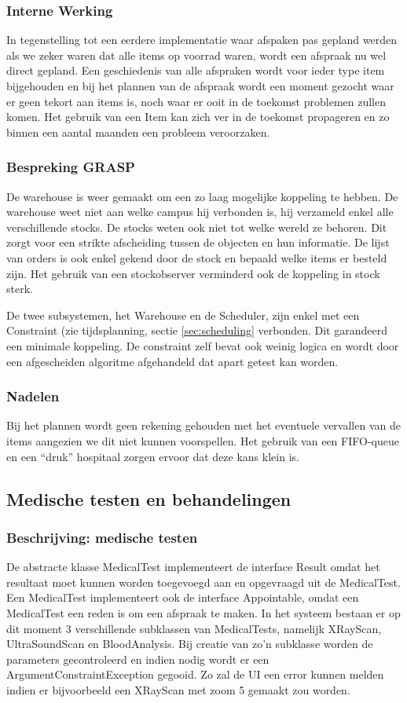 \documentclass[a4paper]{article}
\begin{document}
\subsubsection{Interne Werking}
In tegenstelling tot een eerdere implementatie waar afspaken pas gepland werden als we zeker waren dat alle items op voorrad waren, wordt een afspraak nu wel direct gepland. Een geschiedenis van alle afspraken wordt voor ieder type item bijgehouden en bij het plannen van de afspraak wordt een moment gezocht waar  er geen tekort aan items is, noch waar er ooit in de toekomst problemen zullen komen. Het gebruik van een Item kan zich ver in de toekomst propageren en zo binnen een aantal maanden een probleem veroorzaken. 
\subsubsection{Bespreking GRASP}
De warehouse is weer gemaakt om een zo laag mogelijke koppeling te hebben. De warehouse weet niet aan welke campus hij verbonden is, hij verzameld enkel alle verschillende stocks. De stocks weten ook niet tot welke wereld ze behoren. Dit zorgt voor een strikte afscheiding tussen de objecten en hun informatie. De lijst van orders is ook enkel gekend door de stock en bepaald welke items er besteld zijn. Het gebruik van een stockobserver verminderd ook de koppeling in stock sterk.

De twee subsystemen, het Warehouse en de Scheduler, zijn enkel met een Constraint (zie tijdsplanning, sectie \ref{sec:scheduling} verbonden. Dit garandeerd een minimale koppeling. De constraint zelf bevat ook weinig logica en wordt door een afgescheiden algoritme afgehandeld dat apart getest kan worden.
\subsubsection{Nadelen}
Bij het plannen wordt geen rekening gehouden met het eventuele vervallen van de items aangezien we dit niet kunnen voorspellen. Het gebruik van een FIFO-queue en een ``druk'' hospitaal zorgen ervoor dat deze kans klein is. 

\subsection{Medische testen en behandelingen \label{sec:medicaltest} \label{sec:treatment}}
\subsubsection{Beschrijving: medische testen}
De abstracte klasse MedicalTest implementeert de interface Result omdat het resultaat moet kunnen worden toegevoegd aan en opgevraagd uit de MedicalTest. Een MedicalTest implementeert ook de interface Appointable, omdat een MedicalTest een reden is om een afspraak te maken. In het systeem bestaan er op dit moment 3 verschillende subklassen van MedicalTests, namelijk XRayScan, UltraSoundScan en BloodAnalysis. Bij creatie van zo'n subklasse worden de parameters gecontroleerd en indien nodig wordt er een ArgumentConstraintException gegooid. Zo zal de UI een error kunnen melden indien er bijvoorbeeld een XRayScan met zoom 5 gemaakt zou worden. 
\end{document}
